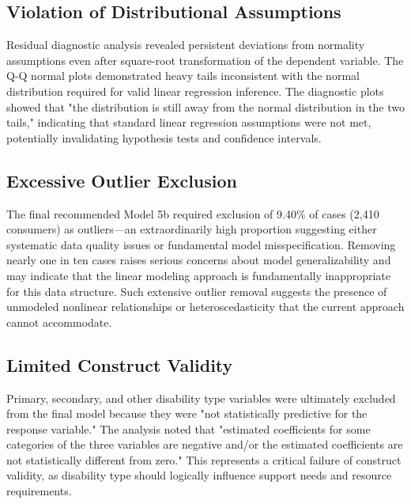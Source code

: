 \subsection{Violation of Distributional Assumptions}
Residual diagnostic analysis revealed persistent deviations from normality assumptions even after square-root transformation of the dependent variable. The Q-Q normal plots demonstrated heavy tails inconsistent with the normal distribution required for valid linear regression inference. The diagnostic plots showed that "the distribution is still away from the normal distribution in the two tails," indicating that standard linear regression assumptions were not met, potentially invalidating hypothesis tests and confidence intervals.

\subsection{Excessive Outlier Exclusion}
The final recommended Model 5b required exclusion of 9.40\% of cases (2,410 consumers) as outliers—an extraordinarily high proportion suggesting either systematic data quality issues or fundamental model misspecification. Removing nearly one in ten cases raises serious concerns about model generalizability and may indicate that the linear modeling approach is fundamentally inappropriate for this data structure. Such extensive outlier removal suggests the presence of unmodeled nonlinear relationships or heteroscedasticity that the current approach cannot accommodate.

\subsection{Limited Construct Validity}
Primary, secondary, and other disability type variables were ultimately excluded from the final model because they were "not statistically predictive for the response variable." The analysis noted that "estimated coefficients for some categories of the three variables are negative and/or the estimated coefficients are not statistically different from zero." This represents a critical failure of construct validity, as disability type should logically influence support needs and resource requirements.

